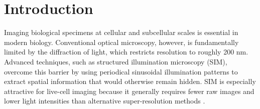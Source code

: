\documentclass[11pt,
  paper=a4, 
  bibliography=totocnumbered,
	captions=tableheading,
	BCOR=10mm
]{scrreprt}
\theoremstyle{definition}
\begin{document}
\tableofcontents
\listoffigures
\listoftables


\chapter{Introduction}





Imaging biological specimens at cellular and subcellular scales is essential in modern biology. Conventional optical microscopy,
 however, is fundamentally limited by the diffraction of light, which restricts resolution to roughly 200 nm. Advanced techniques, 
 such as structured illumination microscopy (SIM), overcome this barrier by using periodical sinusoidal illumination patterns to extract spatial 
 information that would otherwise remain hidden. SIM is especially attractive for live-cell imaging because it generally requires fewer raw
  images and lower light intensities than alternative super-resolution methods \cite{wu-2018}.
\end{document}
